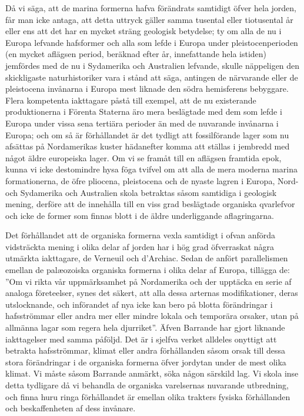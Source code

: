 Då vi säga, att de marina formerna hafva förändrats samtidigt öfver hela jorden, får man icke antaga, att detta uttryck gäller samma tusental eller tiotusental år eller ens att det har en mycket sträng geologisk betydelse; ty om alla de nu i Europa lefvande hafsformer och alla som lefde i Europa under pleistocenperioden (en mycket aflägsen period, beräknad efter år, innefattande hela istiden) jemfördes med de nu i Sydamerika och Australien lefvande, skulle näppeligen den skickligaste naturhistoriker vara i stånd att säga, antingen de närvarande eller de pleistocena invånarna i Europa mest liknade den södra hemisferens bebyggare. Flera kompetenta iakttagare påstå till exempel, att de nu existerande produktionerna i Förenta Staterna äro mera beslägtade med dem som lefde i Europa under vissa sena tertiära perioder än med de nuvarande invånarna i Europa; och om så är förhållandet är det tydligt att fossilförande lager som nu afsättas på Nordamerikas kuster hädanefter komma att ställas i jembredd med något äldre europeiska lager. Om vi se framåt till en aflägsen framtida epok, kunna vi icke destomindre hysa föga tvifvel om att alla de mera moderna marina formationerna, de öfre pliocena, pleistocena och de nyaste lagren i Europa, Nord- och Sydamerika och Australien skola betraktas såsom samtidiga i geologisk mening, derföre att de innehålla till en viss grad beslägtade organiska qvarlefvor och icke de former som finnas blott i de äldre underliggande aflagringarna.

Det förhållandet att de organiska formerna vexla samtidigt i ofvan anförda vidsträckta mening i olika delar af jorden har i hög grad öfverraskat några utmärkta iakttagare, de Verneuil och d’Archiac. Sedan de anfört parallelismen emellan de palæozoiska organiska formerna i olika delar af Europa, tillägga de: ”Om vi rikta vår uppmärksamhet på Nordamerika och der upptäcka en serie af analoga företeelser, synes det säkert, att alla dessa arternas modifikationer, deras utslocknande, och införandet af nya icke kan bero på blotta förändringar i hafsströmmar eller andra mer eller mindre lokala och temporära orsaker, utan på allmänna lagar som regera hela djurriket”. Äfven Barrande har gjort liknande iakttagelser med samma påföljd. Det är i sjelfva verket alldeles onyttigt att betrakta hafsströmmar, klimat eller andra förhållanden såsom orsak till dessa stora förändringar i de organiska formerna öfver jordytan under de mest olika klimat. Vi måste såsom Barrande anmärkt, söka någon särskild lag. Vi skola inse detta tydligare då vi behandla de organiska varelsernas nuvarande utbredning, och finna huru ringa förhållandet är emellan olika trakters fysiska förhållanden och beskaffenheten af dess invånare.


